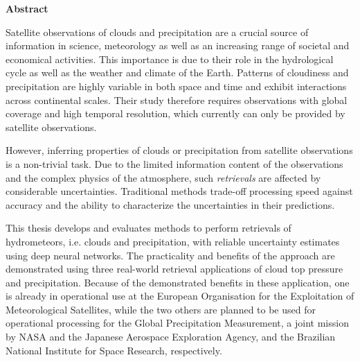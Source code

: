 \thispagestyle{plain}
\begin{center}
  {\large \textbf{\thetitle}}
  
  \vspace{0.4cm}
  
  \vspace{0.4cm}
  {\sc \theauthor}
  
  \vspace{0.9cm}
  \textbf{Abstract}
\end{center}

Satellite observations of clouds and precipitation are a crucial source of
information in science, meteorology as well as an increasing range of societal
and economical activities. This importance is due to their role in the
hydrological cycle as well as the weather and climate of the Earth. Patterns of
cloudiness and precipitation are highly variable in both space and time and
exhibit interactions across continental scales. Their study therefore requires
observations with global coverage and high temporal resolution, which currently
can only be provided by satellite observations.

 However, inferring properties of clouds or precipitation from satellite
observations is a non-trivial task. Due to the limited information content of
the observations and the complex physics of the atmosphere,
such \textit{retrievals} are affected by considerable uncertainties. Traditional
methods trade-off processing speed against accuracy and the ability to
characterize the uncertainties in their predictions.

This thesis develops and evaluates methods to perform retrievals of
hydrometeors, i.e. clouds and precipitation, with reliable uncertainty estimates
using deep neural networks. The practicality and benefits of the approach are
demonstrated using three real-world retrieval applications of cloud top pressure
and precipitation. Because of the demonstrated benefits in these application,
one is already in operational use at the European Organisation for the
Exploitation of Meteorological Satellites, while the two others are planned to
be used for operational processing for the Global Precipitation Measurement, a
joint mission by NASA and the Japanese Aerospace Exploration Agency, and the
Brazilian National Institute for Space Research, respectively.


